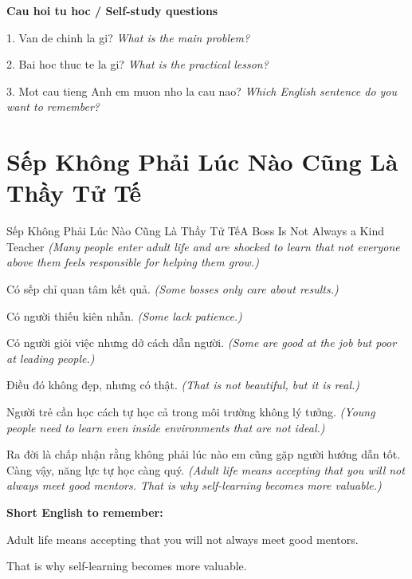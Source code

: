\begin{tuhocnhanh}
\textbf{Cau hoi tu hoc / Self-study questions}

1. Van de chinh la gi? \textit{What is the main problem?}

2. Bai hoc thuc te la gi? \textit{What is the practical lesson?}

3. Mot cau tieng Anh em muon nho la cau nao? \textit{Which English sentence do you want to remember?}
\end{tuhocnhanh}
\ngancach

\section{Sếp Không Phải Lúc Nào Cũng Là Thầy Tử Tế}
\begin{truyen}{Sếp Không Phải Lúc Nào Cũng Là Thầy Tử Tế}{A Boss Is Not Always a Kind Teacher}
\textit{(Many people enter adult life and are shocked to learn that not everyone above them feels responsible for helping them grow.)}

Có sếp chỉ quan tâm kết quả.
\textit{(Some bosses only care about results.)}

Có người thiếu kiên nhẫn.
\textit{(Some lack patience.)}

Có người giỏi việc nhưng dở cách dẫn người.
\textit{(Some are good at the job but poor at leading people.)}

Điều đó không đẹp, nhưng có thật.
\textit{(That is not beautiful, but it is real.)}

Người trẻ cần học cách tự học cả trong môi trường không lý tưởng.
\textit{(Young people need to learn even inside environments that are not ideal.)}

\end{truyen}

\begin{baihoc}
Ra đời là chấp nhận rằng không phải lúc nào em cũng gặp người hướng dẫn tốt. Càng vậy, năng lực tự học càng quý.
\textit{(Adult life means accepting that you will not always meet good mentors. That is why self-learning becomes more valuable.)}
\end{baihoc}

\begin{ghinhoanh}
\textbf{Short English to remember:}

Adult life means accepting that you will not always meet good mentors.

That is why self-learning becomes more valuable.

\end{ghinhoanh}

